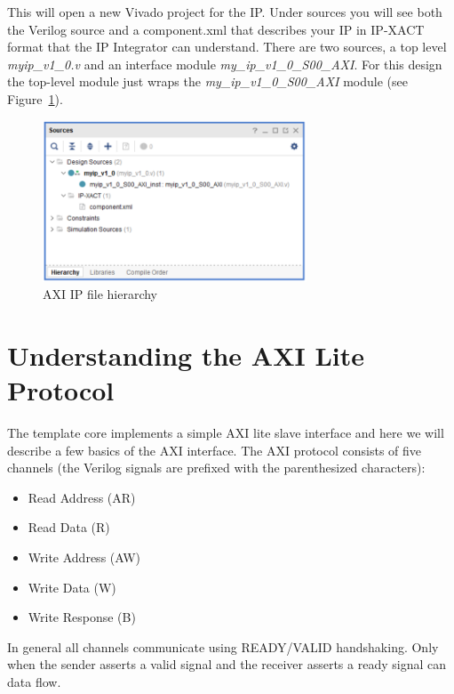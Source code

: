 \documentclass[11pt]{article}
\begin{document}
This will open a new Vivado project for the IP. Under sources you will see both the Verilog source and a component.xml that describes your IP in IP-XACT format that the IP Integrator can understand. There are two sources, a top level \textit{myip\_v1\_0.v} and an interface module \textit{my\_ip\_v1\_0\_S00\_AXI}. For this design the top-level module just wraps the \textit{my\_ip\_v1\_0\_S00\_AXI} module (see Figure~\ref{fig:ip_hier}).

\begin{figure}[!h]
    \centering
    \includegraphics[width=0.7\textwidth]{images/ip_hier.png}
    \caption{AXI IP file hierarchy}
    \label{fig:ip_hier}
\end{figure}




\section{Understanding the AXI Lite Protocol}
\label{sec:understand_axi}
The template core implements a simple AXI lite slave interface and here we will describe a few basics of the AXI interface. The AXI protocol consists of five channels (the Verilog signals are prefixed with the parenthesized characters): 

\begin{itemize}
    \item Read Address (AR)
    \item Read Data (R)
    \item Write Address (AW)
    \item Write Data (W)
    \item Write Response (B)
\end{itemize}

\noindent
In general all channels communicate using READY/VALID handshaking. Only when the
sender asserts a valid signal and the receiver asserts a ready signal can data flow.
\end{document}

